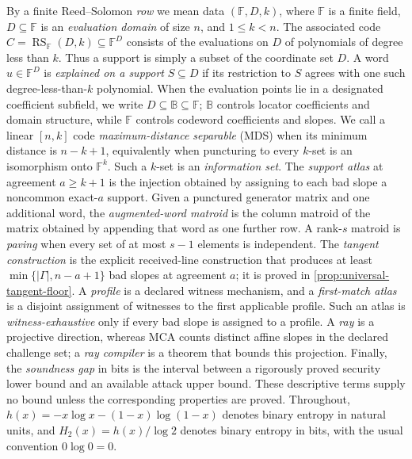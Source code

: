 \documentclass[11pt,a4paper]{amsart}
\numberwithin{equation}{section}
\theoremstyle{remark}
\DeclareMathOperator{\RS}{RS}
\newcommand{\F}{\mathbb F}
\newcommand{\B}{\mathbb B}
\newcommand{\abs}[1]{\lvert #1\rvert}
\begin{document}
By a finite Reed--Solomon \emph{row} we mean data
\((\F,D,k)\), where \(\F\) is a finite field,
\(D\subseteq\F\) is an \emph{evaluation domain} of size \(n\), and
\(1\le k<n\).  The associated code
\(C=\RS_\F(D,k)\subseteq\F^D\) consists of the evaluations on \(D\) of
polynomials of degree less than \(k\).  Thus a support is simply a subset
of the coordinate set \(D\).  A word \(u\in\F^D\) is
\emph{explained on a support} \(S\subseteq D\) if its restriction to
\(S\) agrees with one such degree-less-than-\(k\) polynomial.
When the evaluation points lie in a designated coefficient subfield, we
write \(D\subseteq\B\subseteq\F\); \(\B\) controls locator coefficients
and domain structure, while \(\F\) controls codeword coefficients and
slopes.
We call a linear \([n,k]\) code \emph{maximum-distance separable} (MDS)
when its minimum distance is \(n-k+1\), equivalently when puncturing to
every \(k\)-set is an isomorphism onto \(\F^k\).  Such a \(k\)-set is an
\emph{information set}.  The \emph{support atlas} at agreement \(a\ge k+1\) is the
injection obtained by assigning to each bad slope a noncommon exact-\(a\)
support.  Given a punctured generator matrix and one additional word, the
\emph{augmented-word matroid} is the column matroid of the matrix obtained by
appending that word as one further row.  A rank-\(s\) matroid is \emph{paving}
when every set of at most \(s-1\) elements is independent.  The
\emph{tangent construction} is the explicit received-line construction that
produces at least \(\min\{\abs\Gamma,n-a+1\}\) bad slopes at agreement
\(a\); it is proved in \cref{prop:universal-tangent-floor}.  A
\emph{profile} is a declared witness mechanism, and a \emph{first-match
atlas} is a disjoint assignment of witnesses to the first applicable
profile.  Such an atlas is \emph{witness-exhaustive} only if every bad slope
is assigned to a profile.  A \emph{ray} is a projective direction, whereas
MCA counts distinct affine slopes in the declared challenge set; a
\emph{ray compiler} is a theorem that bounds this projection.  Finally, the
\emph{soundness gap} in bits is the interval between a rigorously proved
security lower bound and an available attack upper bound.  These descriptive
terms supply no bound unless the corresponding properties are proved.
Throughout,
\(h(x)=-x\log x-(1-x)\log(1-x)\) denotes binary entropy in natural
units, and \(H_2(x)=h(x)/\log 2\) denotes binary entropy in bits, with the
usual convention \(0\log0=0\).
\end{document}
